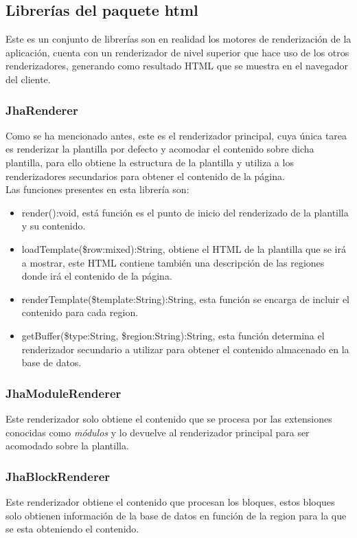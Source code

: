 \subsection{Librer\'ias del paquete \textsf{html}}
Este es un conjunto de librer\'ias son en realidad los motores de renderizaci\'on de la aplicaci\'on, cuenta con un renderizador de nivel superior que hace uso de los otros renderizadores, generando como resultado HTML que se muestra en el navegador del cliente.

\subsubsection{JhaRenderer}
Como se ha mencionado antes, este es el renderizador principal, cuya \'unica tarea es renderizar la plantilla por defecto y acomodar el contenido sobre dicha plantilla, para ello obtiene la estructura de la plantilla y utiliza a los renderizadores secundarios para obtener el contenido de la p\'agina.\\
Las funciones presentes en esta librer\'ia son:

\begin{itemize}
\item \textsf{render():void}, est\'a funci\'on es el punto de inicio del renderizado de la plantilla y su contenido.
\item \textsf{loadTemplate(\$row:mixed):String}, obtiene el HTML de la plantilla que se ir\'a a mostrar, este HTML contiene tambi\'en una descripci\'on de las regiones donde ir\'a el contenido de la p\'agina.
\item \textsf{renderTemplate(\$template:String):String}, esta funci\'on se encarga de incluir el contenido para cada region.
\item \textsf{getBuffer(\$type:String, \$region:String):String}, esta funci\'on determina el renderizador secundario a utilizar para obtener el contenido almacenado en la base de datos.
\end{itemize}

\subsubsection{JhaModuleRenderer}
Este renderizador solo obtiene el contenido que se procesa por las extensiones conocidas como \textit{m\'odulos} y lo devuelve al renderizador principal para ser acomodado sobre la plantilla.

\subsubsection{JhaBlockRenderer}
Este renderizador obtiene el contenido que procesan los bloques, estos bloques solo obtienen informaci\'on de la base de datos en funci\'on de la region para la que se esta obteniendo el contenido.

